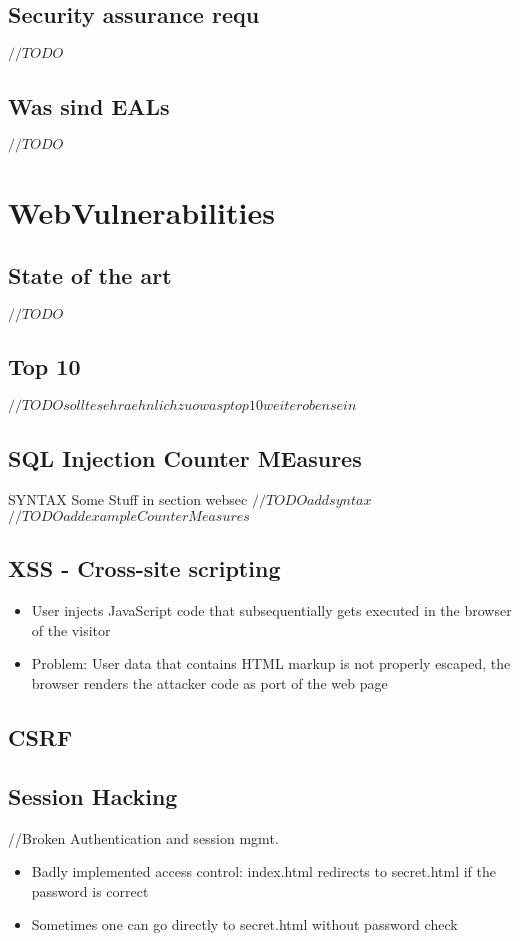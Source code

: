 \documentclass[a4paper, 12pt]{article}
\begin{document}
\subsection{Security assurance requ}
$ //TODO $
\subsection{Was sind EALs}
$ //TODO $

\section{WebVulnerabilities}
\subsection{State of the art}
$ //TODO $
\subsection{Top 10}
$ //TODO sollte sehr aehnlich zu owasp top 10 weiter oben sein$
\subsection{SQL Injection Counter MEasures}
SYNTAX
Some Stuff in section websec 
$ //TODO add syntax $
$ //TODO add example Counter Measures $
\subsection{XSS - Cross-site scripting}
\begin{itemize}
\item User injects JavaScript code that subsequentially gets executed in the browser of the visitor
\item Problem: User data that contains HTML markup is not properly escaped, the browser renders the attacker code as port of the web page
\end{itemize}

\subsection{CSRF}
\subsection{Session Hacking}
//Broken Authentication and session mgmt.
\begin{itemize}
\item Badly implemented access control: index.html redirects to secret.html if the password is correct
\item Sometimes one can go directly to secret.html without password check
\end{itemize}
\end{document}
